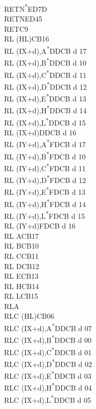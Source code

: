 \documentclass[twoside,openright,a4paper]{book}
\begin{document}
\begin{multicols}{3}
{\begin{tabbing}
	RETN\textsuperscript{*}\>ED7D\\
	RETN\>ED45\\
	RET\>C9\\
	RL (HL)\>CB16\\
	RL (IX+d),A\textsuperscript{*}\>DDCB d 17\\
	RL (IX+d),B\textsuperscript{*}\>DDCB d 10\\
	RL (IX+d),C\textsuperscript{*}\>DDCB d 11\\
	RL (IX+d),D\textsuperscript{*}\>DDCB d 12\\
	RL (IX+d),E\textsuperscript{*}\>DDCB d 13\\
	RL (IX+d),H\textsuperscript{*}\>DDCB d 14\\
	RL (IX+d),L\textsuperscript{*}\>DDCB d 15\\
	RL (IX+d)\>DDCB d 16\\
	RL (IY+d),A\textsuperscript{*}\>FDCB d 17\\
	RL (IY+d),B\textsuperscript{*}\>FDCB d 10\\
	RL (IY+d),C\textsuperscript{*}\>FDCB d 11\\
	RL (IY+d),D\textsuperscript{*}\>FDCB d 12\\
	RL (IY+d),E\textsuperscript{*}\>FDCB d 13\\
	RL (IY+d),H\textsuperscript{*}\>FDCB d 14\\
	RL (IY+d),L\textsuperscript{*}\>FDCB d 15\\
	RL (IY+d)\>FDCB d 16\\
	RL A\>CB17\\
	RL B\>CB10\\
	RL C\>CB11\\
	RL D\>CB12\\
	RL E\>CB13\\
	RL H\>CB14\\
	RL L\>CB15\\
	RLA\\
	RLC (HL)\>CB06\\
	RLC (IX+d),A\textsuperscript{*}\>DDCB d 07\\
	RLC (IX+d),B\textsuperscript{*}\>DDCB d 00\\
	RLC (IX+d),C\textsuperscript{*}\>DDCB d 01\\
	RLC (IX+d),D\textsuperscript{*}\>DDCB d 02\\
	RLC (IX+d),E\textsuperscript{*}\>DDCB d 03\\
	RLC (IX+d),H\textsuperscript{*}\>DDCB d 04\\
	RLC (IX+d),L\textsuperscript{*}\>DDCB d 05\\

\end{tabbing}}
\end{multicols}
\end{document}
